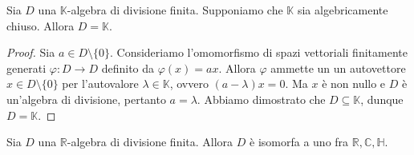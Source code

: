 \begin{proposition}
Sia $D$ una $\mathbb{K}$-algebra di divisione finita. Supponiamo che $\mathbb{K}$ sia algebricamente chiuso. Allora $D=\mathbb{K}$.
\end{proposition}
\begin{proof}
Sia $a\in D\setminus\{0\}$. Consideriamo l'omomorfismo di spazi vettoriali finitamente generati $\varphi:D\to D$ definito da $\varphi(x)=ax$.  Allora $\varphi$ ammette un un autovettore $x\in D\setminus\{0\}$ per l'autovalore $\lambda\in\mathbb{K}$, ovvero $(a-\lambda)x=0$. Ma $x$ è non nullo e $D$ è un'algebra di divisione, pertanto $a=\lambda$. Abbiamo dimostrato che $D\subseteq\mathbb{K}$, dunque $D=\mathbb{K}$.
\end{proof}


\begin{proposition}
Sia $D$ una $\mathbb{R}$-algebra di divisione finita. Allora $D$ è isomorfa a uno fra $\mathbb{R}\comma\mathbb{C}\comma\mathbb{H}$.
\end{proposition}
